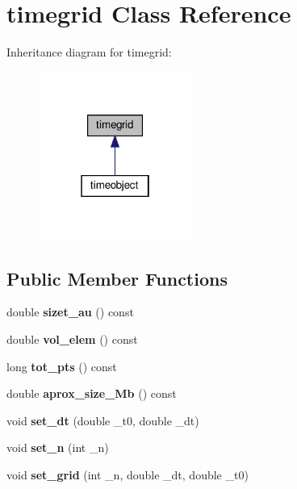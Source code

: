 \hypertarget{classtimegrid}{}\section{timegrid Class Reference}
\label{classtimegrid}


Inheritance diagram for timegrid\+:\nopagebreak
\begin{figure}[H]
\begin{center}
\leavevmode
\includegraphics[width=142pt]{classtimegrid__inherit__graph}
\end{center}
\end{figure}
\subsection*{Public Member Functions}
\begin{DoxyCompactItemize}
\item 
\mbox{\label{classtimegrid_a3110342e5067c921456156ea82cf8f05}} 
double {\bfseries sizet\+\_\+au} () const
\item 
\mbox{\label{classtimegrid_ac8849c4dc4b04a9ddff2001fa41e0289}} 
double {\bfseries vol\+\_\+elem} () const
\item 
\mbox{\label{classtimegrid_a95c655001eaabc2929f892cc1dfa07cc}} 
long {\bfseries tot\+\_\+pts} () const
\item 
\mbox{\label{classtimegrid_ab1a06a3a84323ad0e02bcbf691ac1ca3}} 
double {\bfseries aprox\+\_\+size\+\_\+\+Mb} () const
\item 
\mbox{\label{classtimegrid_af6ce2b593bbd60e43e85ed742c3f7b30}} 
void {\bfseries set\+\_\+dt} (double \+\_\+t0, double \+\_\+dt)
\item 
\mbox{\label{classtimegrid_ae62b3caaabc0629b787e4dcbe6b1bea4}} 
void {\bfseries set\+\_\+n} (int \+\_\+n)
\item 
\mbox{\label{classtimegrid_a39162afae396770902b645c96f3896c4}} 
void {\bfseries set\+\_\+grid} (int \+\_\+n, double \+\_\+dt, double \+\_\+t0)
\end{DoxyCompactItemize}

